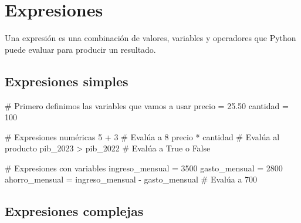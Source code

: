 \documentclass[
  doc,
  floatsintext,
  longtable,
  a4paper,
  nolmodern,
  notxfonts,
  notimes,
  12pt,
  colorlinks=true,linkcolor=blue,citecolor=blue,urlcolor=blue]{apa7}
\newenvironment{Shaded}{\begin{snugshade}}{\end{snugshade}}
\newcommand{\CommentTok}[1]{\textcolor[rgb]{0.37,0.37,0.37}{#1}}
\newcommand{\DecValTok}[1]{\textcolor[rgb]{0.68,0.00,0.00}{#1}}
\newcommand{\FloatTok}[1]{\textcolor[rgb]{0.68,0.00,0.00}{#1}}
\newcommand{\NormalTok}[1]{\textcolor[rgb]{0.00,0.23,0.31}{#1}}
\newcommand{\OperatorTok}[1]{\textcolor[rgb]{0.37,0.37,0.37}{#1}}
\begin{document}
\section{Expresiones}\label{expresiones}

Una expresión es una combinación de valores, variables y operadores que
Python puede evaluar para producir un resultado.

\subsection{Expresiones simples}\label{expresiones-simples}

\begin{Shaded}
\begin{Highlighting}[]
\CommentTok{\# Primero definimos las variables que vamos a usar}
\NormalTok{precio }\OperatorTok{=} \FloatTok{25.50}
\NormalTok{cantidad }\OperatorTok{=} \DecValTok{100}

\CommentTok{\# Expresiones numéricas}
\DecValTok{5} \OperatorTok{+} \DecValTok{3}  \CommentTok{\# Evalúa a 8}
\NormalTok{precio }\OperatorTok{*}\NormalTok{ cantidad  }\CommentTok{\# Evalúa al producto}
\NormalTok{pib\_2023 }\OperatorTok{\textgreater{}}\NormalTok{ pib\_2022  }\CommentTok{\# Evalúa a True o False}

\CommentTok{\# Expresiones con variables}
\NormalTok{ingreso\_mensual }\OperatorTok{=} \DecValTok{3500}
\NormalTok{gasto\_mensual }\OperatorTok{=} \DecValTok{2800}
\NormalTok{ahorro\_mensual }\OperatorTok{=}\NormalTok{ ingreso\_mensual }\OperatorTok{{-}}\NormalTok{ gasto\_mensual  }\CommentTok{\# Evalúa a 700}
\end{Highlighting}
\end{Shaded}

\subsection{Expresiones complejas}\label{expresiones-complejas}
\end{document}
